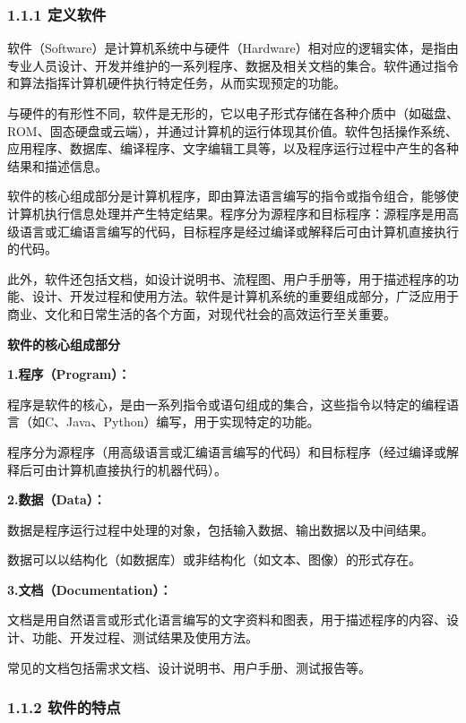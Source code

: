 \subsubsection{1.1.1 定义软件}\label{ux5b9aux4e49ux8f6fux4ef6}

软件（Software）是计算机系统中与硬件（Hardware）相对应的逻辑实体，是指由专业人员设计、开发并维护的一系列程序、数据及相关文档的集合。软件通过指令和算法指挥计算机硬件执行特定任务，从而实现预定的功能。

与硬件的有形性不同，软件是无形的，它以电子形式存储在各种介质中（如磁盘、ROM、固态硬盘或云端），并通过计算机的运行体现其价值。软件包括操作系统、应用程序、数据库、编译程序、文字编辑工具等，以及程序运行过程中产生的各种结果和描述信息。

软件的核心组成部分是计算机程序，即由算法语言编写的指令或指令组合，能够使计算机执行信息处理并产生特定结果。程序分为源程序和目标程序：源程序是用高级语言或汇编语言编写的代码，目标程序是经过编译或解释后可由计算机直接执行的代码。

此外，软件还包括文档，如设计说明书、流程图、用户手册等，用于描述程序的功能、设计、开发过程和使用方法。软件是计算机系统的重要组成部分，广泛应用于商业、文化和日常生活的各个方面，对现代社会的高效运行至关重要。

\textbf{软件的核心组成部分}

\textbf{1.程序（Program）：}

程序是软件的核心，是由一系列指令或语句组成的集合，这些指令以特定的编程语言（如C、Java、Python）编写，用于实现特定的功能。

程序分为源程序（用高级语言或汇编语言编写的代码）和目标程序（经过编译或解释后可由计算机直接执行的机器代码）。

\textbf{2.数据（Data）：}

数据是程序运行过程中处理的对象，包括输入数据、输出数据以及中间结果。

数据可以以结构化（如数据库）或非结构化（如文本、图像）的形式存在。

\textbf{3.文档（Documentation）：}

文档是用自然语言或形式化语言编写的文字资料和图表，用于描述程序的内容、设计、功能、开发过程、测试结果及使用方法。

常见的文档包括需求文档、设计说明书、用户手册、测试报告等。

\subsubsection{1.1.2 软件的特点}\label{ux8f6fux4ef6ux7684ux7279ux70b9}

